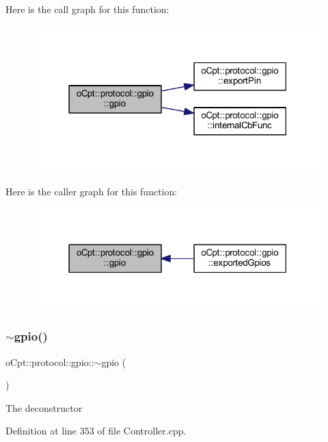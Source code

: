 Here is the call graph for this function\+:\nopagebreak
\begin{figure}[H]
\begin{center}
\leavevmode
\includegraphics[width=318pt]{classo_cpt_1_1protocol_1_1gpio_a8ceba8e1629d1d6e87da53eb097d81e5_cgraph}
\end{center}
\end{figure}
Here is the caller graph for this function\+:\nopagebreak
\begin{figure}[H]
\begin{center}
\leavevmode
\includegraphics[width=318pt]{classo_cpt_1_1protocol_1_1gpio_a8ceba8e1629d1d6e87da53eb097d81e5_icgraph}
\end{center}
\end{figure}
\hypertarget{classo_cpt_1_1protocol_1_1gpio_a8ab3c04e4643a838f8d9ea26367e3545}{}\label{classo_cpt_1_1protocol_1_1gpio_a8ab3c04e4643a838f8d9ea26367e3545} 
\subsubsection{\texorpdfstring{$\sim$gpio()}{~gpio()}}
{\footnotesize\ttfamily o\+Cpt\+::protocol\+::gpio\+::$\sim$gpio (\begin{DoxyParamCaption}{ }\end{DoxyParamCaption})}

The deconstructor 

Definition at line 353 of file Controller.\+cpp.



